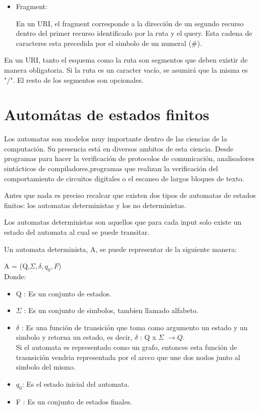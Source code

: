 \documentclass{article}
\begin{document}
\begin{itemize}
\item Fragment:

En un URI, el fragment corresponde a la direcci\'on de un segundo recurso dentro del primer recurso identificado por la ruta y el query. Esta cadena de caracteres esta precedida por el simbolo de un numeral (\#).\\

\end{itemize}

En un URI, tanto el esquema como la ruta son segmentos que deben existir de manera obligatoria. Si la ruta es un caracter vac\'io, se asumir\'a que la misma es "/". El resto de los segmentos son opcionales.\\

\section{Autom\'atas de estados finitos}

Los automatas son modelos muy importante dentro de las ciencias de la computaci\'on. Su presencia est\'a  en diversos ambitos de esta ciencia. Desde programas para hacer la verificaci\'on de protocolos de comunicaci\'on, analisadores sint\'acticos de compiladores,programas que realizan la verificaci\'on del comportamiento de circuitos digitales o el escaneo de largos bloques de texto.

Antes que nada es preciso recalcar que existen dos tipos de automatas de estados finitos: los automatas deterministas y los no deterministas.

Los automatas deterministas son aquellos que para cada input solo existe un estado del automata al cual se puede transitar.

Un automata determinista, A, se puede representar de la siguiente manera:

A = (Q,$\Sigma,\delta,q_{0},F$)\\

Donde:

\begin{itemize}

\item Q : Es un conjunto de estados.\\
\item $\Sigma$ : Es un conjunto de simbolos, tambien llamado alfabeto.\\

\item $\delta$ : Es una funci\'on de transici\'on que toma como argumento un estado y un simbolo y retorna un estado, es decir, $\delta$ : Q x $\Sigma$ $\rightarrow Q.$\\
Si el automata es representado como un grafo, entonces esta funci\'on de trasnsici\'on vendria representada por el arcco que une dos nodos junto al simbolo del mismo.

\item $q_{0}$: Es el estado inicial del automata.\\

\item F : Es un conjunto de estados finales.\\

\end{itemize}
\end{document}
